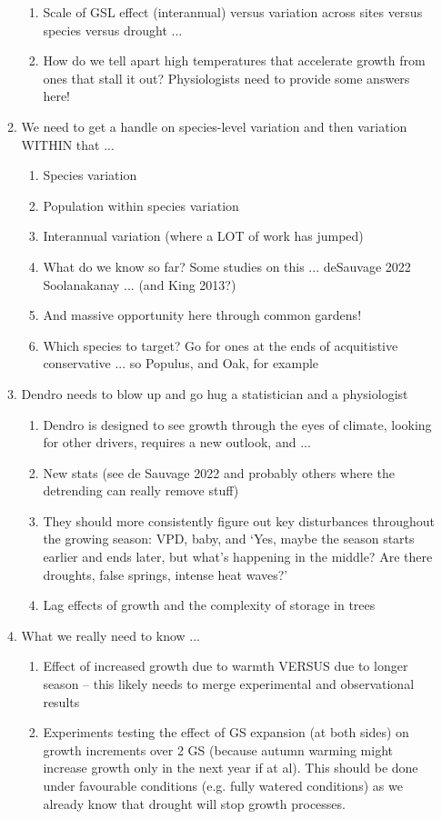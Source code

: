 \documentclass[11pt,letter]{article}
\begin{document}
\begin{enumerate}
\begin{enumerate}
\begin{enumerate}
\item Scale of GSL effect (interannual) versus variation across sites versus species versus drought ... 
\item How do we tell apart high temperatures that accelerate growth from ones that stall it out? Physiologists need to provide some answers here!
\end{enumerate}
\item We need to get a handle on species-level variation and then variation WITHIN that ... 
\begin{enumerate}
\item Species variation
\item Population within species variation 
\item Interannual variation (where a LOT of work has jumped)
\item What do we know so far? Some studies on this ... deSauvage 2022 Soolanakanay ... (and King 2013?)
\item And massive opportunity here through common gardens!
\item Which species to target? Go for ones at the ends of acquitistive conservative ... so Populus, and Oak, for example
\end{enumerate}
\item Dendro needs to blow up and go hug a statistician and a physiologist
\begin{enumerate}
\item Dendro is designed to see growth through the eyes of climate, looking for other drivers, requires a new outlook, and ...
\item New stats (see de Sauvage 2022 and probably others where the detrending can really remove stuff)
\item They should more consistently figure out key disturbances throughout the growing season: VPD, baby, and `Yes, maybe the season starts earlier and ends later, but what's happening in the middle? Are there droughts, false springs, intense heat waves?'
\item Lag effects of growth and the complexity of storage in trees
\end{enumerate}
\item What we really need to know ...
\begin{enumerate}
\item Effect of increased growth due to warmth VERSUS due to longer season -- this likely needs to merge experimental and observational results
\item Experiments testing the effect of GS expansion (at both sides) on growth increments over 2 GS (because autumn warming might increase growth only in the next year if at al). This should be done under favourable conditions (e.g. fully watered conditions) as we already know that drought will stop growth processes.

\end{enumerate}
\end{enumerate}
\end{enumerate}
\end{document}
